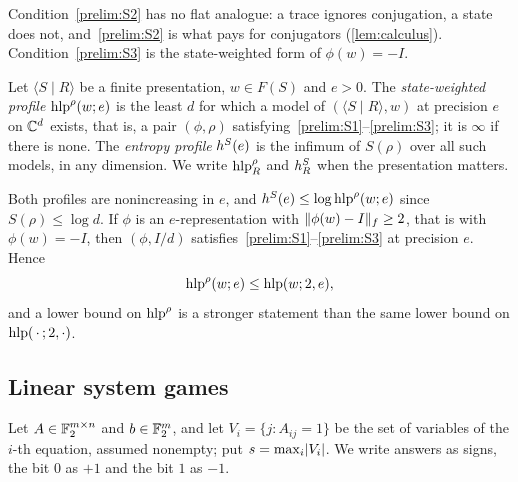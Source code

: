 Condition~\ref{prelim:S2} has no flat analogue: a trace ignores conjugation, a state does not, and~\ref{prelim:S2} is what pays for conjugators
(\cref{lem:calculus}). Condition~\ref{prelim:S3} is the state-weighted form of $\phi(w)=-I$.

\begin{definition}\label{def:state-profile}
Let $\langle S\mid R\rangle$ be a finite presentation, $w\in F(S)$ and $e>0$. The \emph{state-weighted profile} $\operatorname{hlp}^{\rho}(w;e)$ is the least $d$
for which a model of $(\langle S\mid R\rangle,w)$ at precision $e$ on $\mathbb C^d$ exists, that is, a pair $(\phi,\rho)$
satisfying~\ref{prelim:S1}--\ref{prelim:S3}; it is $\infty$ if there is none. The \emph{entropy profile} $h^{S}(e)$ is the infimum of $S(\rho)$ over all such
models, in any dimension. We write $\operatorname{hlp}^{\rho}_R$ and $h^{S}_R$ when the presentation matters.
\end{definition}

Both profiles are nonincreasing in $e$, and $h^{S}(e)\le\log\operatorname{hlp}^{\rho}(w;e)$ since $S(\rho)\le\log d$. If $\phi$ is an $e$-representation with
$\lVert \phi(w)-I\rVert_f\ge2$, that is with $\phi(w)=-I$, then $(\phi,I/d)$ satisfies~\ref{prelim:S1}--\ref{prelim:S3} at precision $e$. Hence
\[
\operatorname{hlp}^{\rho}(w;e)\le\operatorname{hlp}(w;2,e),
\]
and a lower bound on $\operatorname{hlp}^{\rho}$ is a stronger statement than the same lower bound on $\operatorname{hlp}(\,\cdot\,;2,\cdot)$.

\subsection{Linear system games}

Let $A\in\mathbb F_2^{m\times n}$ and $b\in\mathbb F_2^m$, and let $V_i=\{j:A_{ij}=1\}$ be the set of variables of the $i$-th equation, assumed nonempty;
put $s=\max_i\lvert V_i\rvert$. We write answers as signs, the bit $0$ as $+1$ and the bit $1$ as $-1$.

